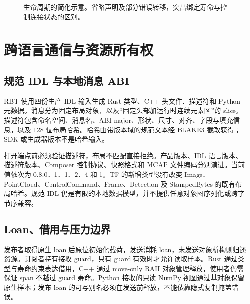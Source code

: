 \documentclass[UTF8,fontset=none,zihao=-4,a4paper]{ctexart}
\begin{document}
\begin{figure}[htbp]
\centering
{}
\caption{生命周期的简化示意。省略声明及部分错误转移，突出绑定寿命与控制连接状态的区别。}
\label{fig:lifecycle}
\end{figure}

\section{跨语言通信与资源所有权}
\subsection{规范 IDL 与本地消息 ABI}
RBT 使用四份生产 IDL 输入生成 Rust 类型、C++ 头文件、描述符和 Python 元数据。消息分为固定布局对象，以及“固定头部加运行时连续元素区”的 slice。描述符包含命名空间、消息名、ABI major、形状、尺寸、对齐、字段与填充信息，以及 128 位布局哈希。哈希由带版本域的规范文本经 BLAKE3 截取获得；SDK 或生成器版本不是哈希输入\cite{rbtabi}。

打开端点前必须验证描述符，布局不匹配直接拒绝。产品版本、IDL 语言版本、描述符版本、Composer 控制协议、快照格式和 MCAP 文件编码分别演进。当前值依次为 0.8.0、1、1、2、4 和 1。TF 的新增类型没有改变 Image、PointCloud、ControlCommand、Frame、Detection 及 StampedBytes 的既有布局哈希。规范 IDL 仍是有限的本地数据模型，并不提供任意对象图序列化或跨字节序兼容。

\subsection{Loan、借用与压力边界}
发布者取得原生 loan 后原位初始化载荷，发送消耗 loan，未发送对象析构则归还资源。订阅者持有接收 guard，只有 guard 有效时才允许读取样本。Rust 通过类型与寿命约束表达借用，C++ 通过 move-only RAII 对象管理释放，使用者仍需保证 span 不越过 guard 寿命。Python 接收的只读 NumPy 视图通过基对象保留原生样本；发布 loan 的可写别名必须在发送前释放，不能依靠隐式复制掩盖错误\cite{rbtpython}。
\end{document}
